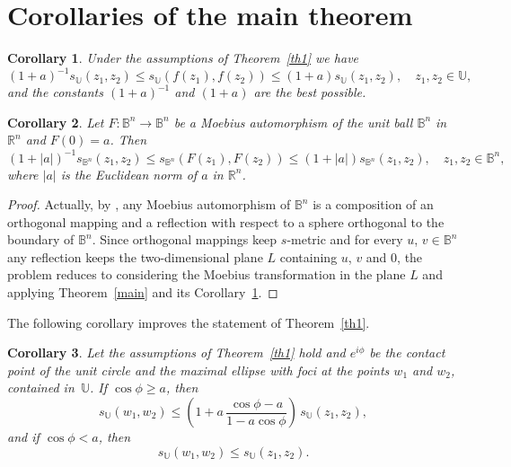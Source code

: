 \documentclass[12pt,a4paper]{amsart}
\newtheorem{corollary}{Corollary}
\begin{document}
\section{Corollaries of the main theorem}

\begin{corollary}\label{cor1}
Under the assumptions of Theorem~\ref{th1}  we have
\begin{equation}\label{main1}
(1+a)^{-1}s_\mathbb{U}(z_1,z_2)\le s_\mathbb{U}(f(z_1),f(z_2))\le (1+a)s_\mathbb{U}(z_1,z_2), \quad z_1, z_2\in \mathbb{U},
\end{equation}
and the constants $(1+a)^{-1}$ and $(1+a)$  are the best possible.
\end{corollary}


\begin{corollary}\label{cor2}
Let $F:\mathbb{B}^n\to \mathbb{B}^n$  be a Moebius automorphism of the unit ball $\mathbb{B}^n$ in $\mathbb{R}^n$ and $F(0)=a$. Then
$$(1+|a|)^{-1}s_{\mathbb{B}^n}(z_1,z_2)\le s_{\mathbb{B}^n}(F(z_1),F(z_2))\le (1+|a|)s_{\mathbb{B}^n}(z_1,z_2), \quad z_1, z_2\in \mathbb{B}^n,$$
where  $|a|$ is the Euclidean norm of $a$ in $\mathbb{R}^n$.
\end{corollary}

\begin{proof} Actually, by \cite[thrm~3.5.1~(i)]{beardon}, any Moebius automorphism of $\mathbb{B}^n$ is a composition of an orthogonal mapping and a reflection with respect to a sphere orthogonal to the boundary of $\mathbb{B}^n$. Since orthogonal mappings keep $s$-metric and for every $u$, $v\in \mathbb{B}^n$ any reflection keeps the two-dimensional plane $L$ containing $u$, $v$ and $0$, the problem reduces to considering the Moebius transformation in the plane $L$ and applying Theorem~\ref{main} and its Corollary~\ref{cor1}.

\end{proof}

The following corollary improves the statement of Theorem~\ref{th1}.

\begin{corollary}\label{cor3}
Let the assumptions of Theorem~\ref{th1}  hold and $e^{i\phi}$ be the contact point  of the unit circle and the maximal ellipse with foci at the points $w_1$ and $w_2$, contained in~$\mathbb{U}$. If $\cos\phi\ge a$, then
$$
s_\mathbb{U}(w_1,w_2)\le \left(1+a\,\frac{\cos\phi-a}{1-a\cos\phi}\right)\,s_\mathbb{U}(z_1,z_2),
$$
and if $\cos\phi< a$, then
$$
s_\mathbb{U}(w_1,w_2)\le s_\mathbb{U}(z_1,z_2).
$$
\end{corollary}
\end{document}
